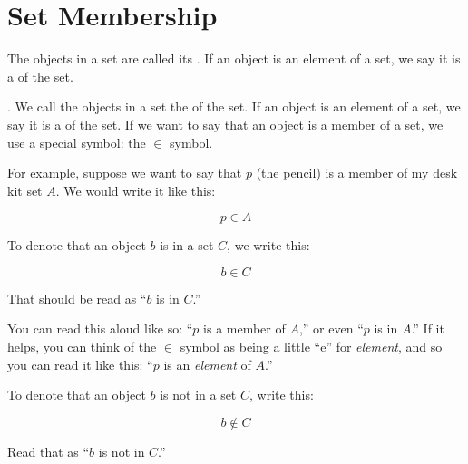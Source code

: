 \documentclass[../../../main.tex]{subfiles}
\begin{document}
\section{Set Membership}

\begin{terminology}
  The objects in a set are called its . If an object is an element of a set, we say it is a  of the set. 
\end{terminology}

. We call the objects in a set the  of the set. If an object is an element of a set, we say it is a  of the set. If we want to say that an object is a member of a set, we use a special symbol: the $\in$ symbol. 

For example, suppose we want to say that $p$ (the pencil) is a member of my desk kit set $A$. We would write it like this:

\begin{equation*}
  p \in A
\end{equation*}

\begin{aside}
  \begin{notation}
    To denote that an object $b$ is in a set $C$, we write this:
    
    \begin{equation*}
      b \in C
    \end{equation*}
    
    \noindent
    That should be read as ``$b$ is in $C$.''
  \end{notation}
\end{aside}

You can read this aloud like so: ``$p$ is a member of $A$,'' or even ``$p$ is in $A$.'' If it helps, you can think of the $\in$ symbol as being a little ``e'' for \emph{element}, and so you can read it like this: ``$p$ is an \emph{element} of $A$.''

\begin{aside}
  \begin{notation}
    To denote that an object $b$ is not in a set $C$, write this:
    
    \begin{equation*}
      b \not \in C
    \end{equation*}
    
    \noindent
    Read that as ``$b$ is not in $C$.''
  \end{notation}
\end{aside}
\end{document}
